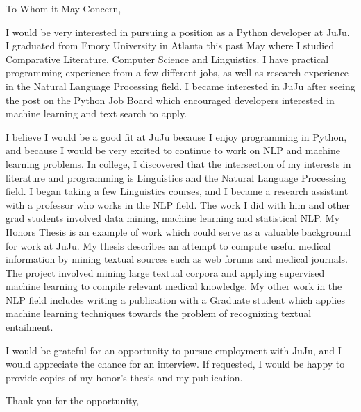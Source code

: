 
\signature{Walter Askew\\
  2065 N Hoyne Ave\\
  Apartment 2R\\
  Chicago, IL 60647}

\begin{letter}{}

  \opening{To Whom it May Concern,}
  
  I would be very interested in pursuing a position as a Python
  developer at JuJu.
  I graduated from Emory University in Atlanta this past May where I
  studied Comparative Literature, Computer Science and Linguistics.
  I have practical programming experience from a few different jobs,
  as well as research experience in the Natural Language Processing
  field.
  I became interested in JuJu after seeing the post on the Python Job
  Board which encouraged developers interested in machine learning and
  text search to apply.

  I believe I would be a good fit at JuJu because I enjoy programming
  in Python, and because I would be very excited to continue to work on
  NLP and machine learning problems.
  In college, I discovered that the intersection of my interests in
  literature and programming is Linguistics and the Natural Language
  Processing field.
  I began taking a few Linguistics courses, and I became a research
  assistant with a professor who works in the NLP field.
  The work I did with him and other grad students involved data
  mining, machine learning and statistical NLP.
  My Honors Thesis is an example of work which could serve as a
  valuable background for work at JuJu.
  My thesis describes an attempt to compute useful medical
  information by mining textual sources such as  web forums and
  medical journals.
  The project involved mining large textual corpora and applying
  supervised machine learning to compile relevant medical knowledge.
  My other work in the NLP field includes writing a publication with a
  Graduate student which applies machine learning techniques towards
  the problem of recognizing textual entailment.

  I would be grateful for an opportunity to pursue employment with
  JuJu, and I would appreciate the chance for an interview.  If
  requested, I would be happy to provide copies of my honor's thesis
  and my publication.

  \closing{Thank you for the opportunity,}
\end{letter}
